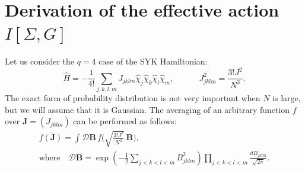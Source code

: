 \documentclass[12pt]{article}
\newcommand*{\useshortskip}[1]{{%
\setlength\abovedisplayskip\abovedisplayshortskip#1}\ignorespaces}
\newcommand*{\V}[1]{\boldsymbol{#1}}
\newcommand{\calD}{\mathcal{D}}
\begin{document}
\appendix

\section{Derivation of the effective action $I[\Sigma,G]$}
\label{sec_replicas}

Let us consider the $q=4$ case of the SYK Hamiltonian:
\begin{equation}
\hat{H} =-\frac{1}{4!}
\sum_{j,k,l,m}J_{jklm}\hat{\chi}_j\hat{\chi}_k\hat{\chi}_l\hat{\chi}_m,
\qquad\quad
\overline{J_{jklm}^2}=\frac{3!J^2}{N^3}.
\end{equation}
The exact form of probability distribution is not very important when $N$ is large, but we will assume that it is Gaussian. The averaging of an arbitrary function $f$ over $\V{J}=(J_{jklm})$ can be performed as follows:
\useshortskip{\begin{gather}
\overline{f(\V{J})}=\int\calD\V{B}\,
f\biggl(\sqrt{\tfrac{3!J^2}{N^3}}\,\V{B}\biggr),\\[3pt]
\text{where}\quad
\calD\V{B}
=\exp\left(-\frac{1}{2}\sum_{j<k<l<m}B_{jklm}^2\right)
\prod_{j<k<l<m}\!\frac{dB_{jklm}}{\sqrt{2\pi}}.
\end{gather}}
\end{document}
